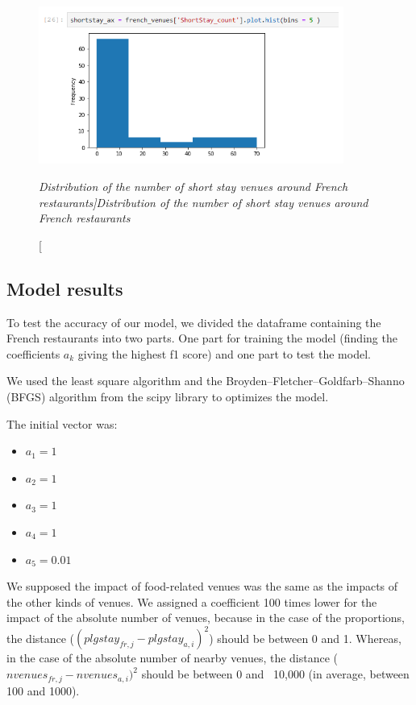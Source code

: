 \documentclass[12pt,a4paper]{article}
\begin{document}
\begin{figure}[ht]
	\begin{center}
			  \includegraphics[width=10cm]{hist_shortstay.png}
	\end{center}
	\caption [\itshape Distribution of the number of short stay venues around French restaurants]{\itshape Distribution of the number of short stay venues around French restaurants}	
	\label{hist_shortstay}
\end{figure}

\subsection{Model results}

To test the accuracy of our model, we divided the dataframe containing the French restaurants into two parts.
One part for training the model (finding the coefficients $a_k$ giving the highest f1 score) and one part to test the model.

\medskip

We used the least square algorithm and the Broyden–Fletcher–Goldfarb–Shanno (BFGS) algorithm from the scipy library to optimizes the model.

\medskip

The initial vector was:

\begin{itemize}
	\item $a_1 = 1$
	\item $a_2 = 1$
	\item $a_3 = 1$
	\item $a_4 = 1$
	\item $a_5 = 0.01$
\end{itemize}

We supposed the impact of food-related venues was the same as the impacts of the other kinds of venues.
We assigned a coefficient 100 times lower for the impact of the absolute number of venues, because in the case of the proportions, the distance ($(plgstay_{fr,j} - plgstay_{a,i})^2$) should be between 0 and 1. Whereas, in the case of the absolute number of nearby venues, the distance ($nvenues_{fr,j} - nvenues_{a,i})^2$ should be between 0 and ~10,000 (in average, between 100 and 1000).
\end{document}
